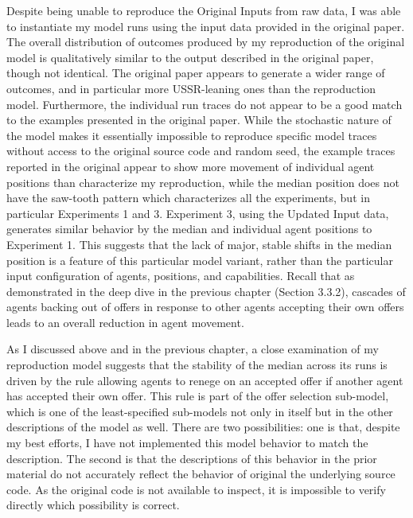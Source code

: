 Despite being unable to reproduce the Original Inputs from raw data, I was able to instantiate my model runs using the input data provided in the original paper. The overall distribution of outcomes produced by my reproduction of the original model is qualitatively similar to the output described in the original paper, though not identical. The original paper appears to generate a wider range of outcomes, and in particular more USSR-leaning ones than the reproduction model. Furthermore, the individual run traces do not appear to be a good match to the examples presented in the original paper. While the stochastic nature of the model makes it essentially impossible to reproduce specific model traces without access to the original source code and random seed, the example traces reported in the original appear to show more movement of individual agent positions than characterize my reproduction, while the median position does not have the saw-tooth pattern which characterizes all the experiments, but in particular Experiments 1 and 3. 
Experiment 3, using the Updated Input data, generates similar behavior by the median and individual agent positions to Experiment 1. This suggests that the lack of major, stable shifts in the median position is a feature of this particular model variant, rather than the particular input configuration of agents, positions, and capabilities. Recall that as demonstrated in the deep dive in the previous chapter (Section 3.3.2), cascades of agents backing out of offers in response to other agents accepting their own offers leads to an overall reduction in agent movement.

As I discussed above and in the previous chapter, a close examination of my reproduction model suggests that the stability of the median across its runs is driven by the rule allowing agents to renege on an accepted offer if another agent has accepted their own offer. This rule is part of the offer selection sub-model, which is one of the least-specified sub-models not only in \citet{bdm_1998} itself but in the other descriptions of the model as well. There are two possibilities: one is that, despite my best efforts, I have not implemented this model behavior to match the description. The second is that the descriptions of this behavior in the prior material do not accurately reflect the behavior of original the underlying source code. As the original code is not available to inspect, it is impossible to verify directly which possibility is correct. 

